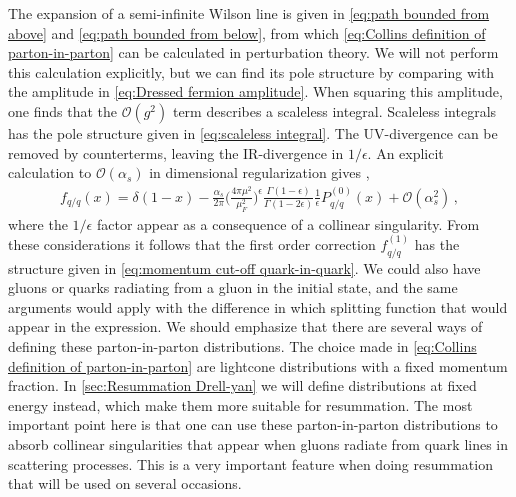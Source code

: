 The expansion of a semi-infinite Wilson line is given in \cref{eq:path bounded from above} and \cref{eq:path bounded from below}, from which \cref{eq:Collins definition of parton-in-parton} can be calculated in perturbation theory. We will not perform this calculation explicitly, but we can find its pole structure by comparing with the amplitude in \cref{eq:Dressed fermion amplitude}. When squaring this amplitude, one finds that the $\mathcal{O}(g
^{2})$ term describes a scaleless integral. Scaleless integrals has the pole structure given in \cref{eq:scaleless integral}. The UV-divergence can be removed by counterterms, leaving the IR-divergence in $1/\epsilon$. An explicit calculation to $\mathcal{O}(\alpha_s)$ in dimensional regularization gives \cite{Collins:1989gx},
\begin{align}\label{eq:quark in quark PDF to one-loop}
    f_{q/q}(x)=\delta(1-x)-\frac{\alpha_s}{2\pi}\Big(\frac{4\pi\mu^{2}}{\mu_{F}^{2}}\Big)^{\epsilon}\frac{\Gamma(1-\epsilon)}{\Gamma(1-2\epsilon)}\frac{1}{\epsilon}P_{q/q}^{(0)}(x)+\mathcal{O}(\alpha_{s}^{2})\,,
\end{align}
where the $1/\epsilon$ factor appear as a consequence of a collinear singularity. From these considerations it follows that the first order correction $f_{q/q}^{(1)}$ has the structure given in \cref{eq:momentum cut-off quark-in-quark}. We could also have gluons or quarks radiating from a gluon in the initial state, and the same arguments would apply with the difference in which splitting function that would appear in the expression. We should emphasize that there are several ways of defining these parton-in-parton distributions. The choice made in \cref{eq:Collins definition of parton-in-parton} are lightcone distributions with a fixed momentum fraction. In \cref{sec:Resummation Drell-yan} we will define distributions at fixed energy instead, which make them more suitable for resummation. The most important point here is that one can use these parton-in-parton distributions to absorb collinear singularities that appear when gluons radiate from quark lines in scattering processes. This is a very important feature when doing resummation that will be used on several occasions. 

   






 

